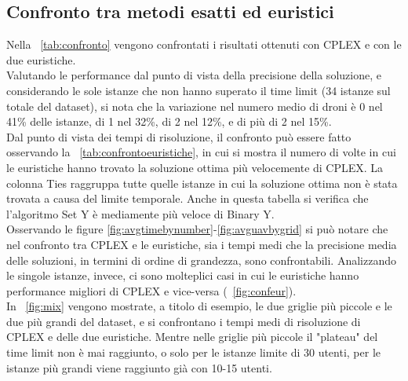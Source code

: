 \subsection{Confronto tra metodi esatti ed euristici}
Nella \tablename\ \ref{tab:confronto} vengono confrontati i risultati ottenuti con CPLEX e con le due euristiche. \\
Valutando le performance dal punto di vista della precisione della soluzione, e considerando le sole istanze che non hanno superato il time limit (34 istanze sul totale del dataset), si nota che la variazione nel numero medio di droni è 0 nel 41\% delle istanze, di 1 nel 32\%, di 2 nel 12\%, e di più di 2 nel 15\%. \\
Dal punto di vista dei tempi di risoluzione, il confronto può essere fatto osservando la \tablename\ \ref{tab:confrontoeuristiche}, in cui si mostra il numero di volte in cui le euristiche hanno trovato la soluzione ottima più velocemente di CPLEX. La colonna Ties raggruppa tutte quelle istanze in cui la soluzione ottima non è stata trovata a causa del limite temporale. Anche in questa tabella si verifica che l'algoritmo Set Y è mediamente più veloce di Binary Y. \\
Osservando le figure \ref{fig:avgtimebynumber}-\ref{fig:avguavbygrid} si può notare che nel confronto tra CPLEX e le euristiche, sia i tempi medi che la precisione media delle soluzioni, in termini di ordine di grandezza, sono confrontabili. Analizzando le singole istanze, invece, ci sono molteplici casi in cui le euristiche hanno performance migliori di CPLEX e vice-versa (\figurename\ \ref{fig:confeur}). \\
In \figurename\ \ref{fig:mix} vengono mostrate, a titolo di esempio, le due griglie più piccole e le due più grandi del dataset, e si confrontano i tempi medi di risoluzione di CPLEX e delle due euristiche. Mentre nelle griglie più piccole il "plateau" del time limit non è mai raggiunto, o solo per le istanze limite di 30 utenti, per le istanze più grandi viene raggiunto già con 10-15 utenti.\\
%
